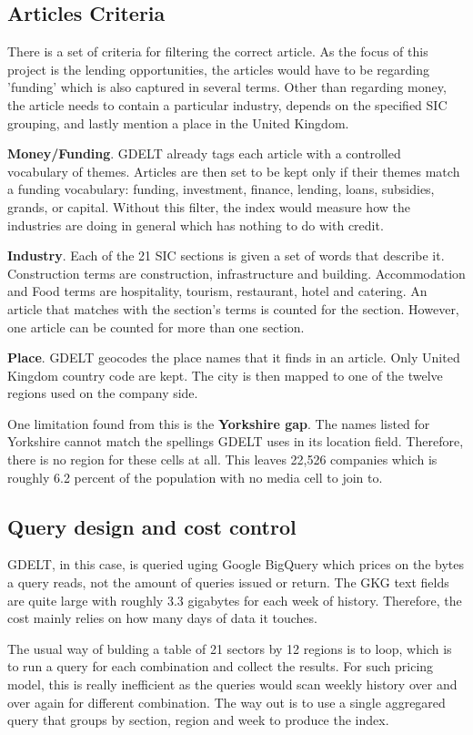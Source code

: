 \documentclass[ %
                    author={Natchalin Iwsakul \\ Inkaphol Siriwongwattana \\ Tanaphan Kummaraphat \\ Patorn Srisupap},
                supervisor={Fernando Moreno-Pino},
                    degree={MSc},
                     title={Propensity Modelling for SME Commercial Lending Using Open Public Data},
                  subtitle={Companies House filings and GDELT media coverage as predictors of first-time borrowing},
                      type={},
                      year={2026}]{dissertation}
\begin{document}
  \subsection{Articles Criteria}
    There is a set of criteria for filtering the correct article. As the focus of this project is the lending opportunities, the articles would have to be regarding 'funding' which is also captured in several terms. Other than regarding money, the article needs to contain a particular industry, depends on the specified SIC grouping, and lastly mention a place in the United Kingdom.

    \textbf{Money/Funding}. GDELT already tags each article with a controlled vocabulary of themes. Articles are then set to be kept only if their themes match a funding vocabulary: funding, investment, finance, lending, loans, subsidies, grands, or capital. Without this filter, the index would measure how the industries are doing in general which has nothing to do with credit.

    \textbf{Industry}. Each of the 21 SIC sections is given a set of words that describe it. Construction terms are construction, infrastructure and building. Accommodation and Food terms are hospitality, tourism, restaurant, hotel and catering. An article that matches with the section's terms is counted for the section. However, one article can be counted for more than one section.

    \textbf{Place}. GDELT geocodes the place names that it finds in an article. Only United Kingdom country code are kept. The city is then mapped to one of the twelve regions used on the company side.

    One limitation found from this is the \textbf{Yorkshire gap}. The names listed for Yorkshire cannot match the spellings GDELT uses in its location field. Therefore, there is no region for these cells at all. This leaves 22,526 companies which is roughly 6.2 percent of the population with no media cell to join to.
  \subsection{Query design and cost control}
    GDELT, in this case, is queried uging Google BigQuery which prices on the bytes a query reads, not the amount of queries issued or return. The GKG text fields are quite large with roughly 3.3 gigabytes for each week of history. Therefore, the cost mainly relies on how many days of data it touches.

    The usual way of bulding a table of 21 sectors by 12 regions is to loop, which is to run a query for each combination and collect the results. For such pricing model, this is really inefficient as the queries would scan weekly history over and over again for different combination. The way out is to use a single aggregared query that groups by section, region and week to produce the index.
\end{document}
